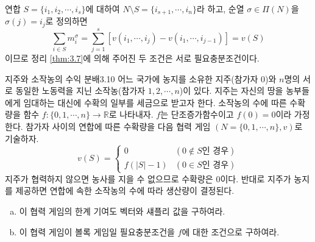 \documentclass{article}
\numberwithin{equation}{section}
\begin{document}
\begin{sol}
	연합 $S=\{i_1,i_2,\cdots,i_s\}$에 대하여 $N\setminus S=\{i_{s+1},\cdots,i_n\}$라 하고, 순열 $\sigma\in\Pi(N)$을 $\sigma(j)=i_j$로 정의하면 
	\[
		\sum_{i\in S}m_i^\sigma=\sum_{j=1}^s[v(i_1,\cdots,i_j)-v(i_1,\cdots,i_{j-1})]=v(S)
	\]
	이므로 정리 \ref{thm:3.7}에 의해 주어진 두 조건은 서로 필요충분조건이다.
\end{sol}

\begin{prob}{지주와 소작농의 수익 분배}{3.10}
	어느 국가에 농지를 소유한 지주(참가자 $0$)와 $n$명의 서로 동일한 노동력을 지닌 소작농(참가자 $1,2,\cdots,n$)이 있다. 지주는 자신의 땅을 농부들에게 임대하는 대신에 수확의 일부를 세금으로 받고자 한다. 소작농의 수에 따른 수확량을 함수 $f:\{0,1,\cdots,n\}\to\mathbb R$로 나타내자. $f$는 단조증가함수이고 $f(0)=0$이라 가정한다. 참가자 사이의 연합에 따른 수확량을 다음 협력 게임 $(N=\{0,1,\cdots,n\},v)$로 기술하자.
	\[
		v(S)=\begin{cases}
			0 & (0\notin S\text{인 경우})\\
			f(\vert S\vert-1) & (0\in S\text{인 경우})
		\end{cases}
	\]
	지주가 협력하지 않으면 농사를 지을 수 없으므로 수확량은 $0$이다. 반대로 지주가 농지를 제공하면 연합에 속한 소작농의 수에 따라 생산량이 결정된다.
	\begin{enumerate}[(a)]
		\item 이 협력 게임의 한계 기여도 벡터와 섀플리 값을 구하여라.
		\item 이 협력 게임이 볼록 게임일 필요충분조건을 $f$에 대한 조건으로 구하여라.
	\end{enumerate}
\end{prob}
\end{document}
